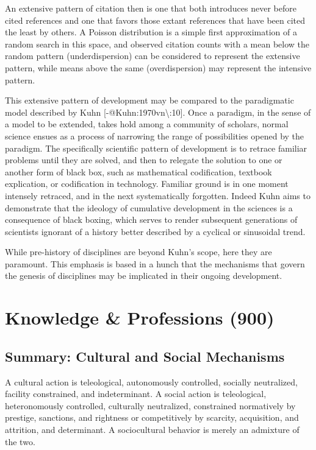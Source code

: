 \documentclass[]{article}
\begin{document}
An extensive pattern of citation then is one that both introduces never
before cited references and one that favors those extant references that
have been cited the least by others. A Poisson distribution is a simple
first approximation of a random search in this space, and observed
citation counts with a mean below the random pattern (underdispersion)
can be considered to represent the extensive pattern, while means above
the same (overdispersion) may represent the intensive pattern.

This extensive pattern of development may be compared to the
paradigmatic model described by Kuhn
{[}-@Kuhn:1970vn\textbackslash{}:10{]}. Once a paradigm, in the sense of
a model to be extended, takes hold among a community of scholars, normal
science ensues as a process of narrowing the range of possibilities
opened by the paradigm. The specifically scientific pattern of
development is to retrace familiar problems until they are solved, and
then to relegate the solution to one or another form of black box, such
as mathematical codification, textbook explication, or codification in
technology. Familiar ground is in one moment intensely retraced, and in
the next systematically forgotten. Indeed Kuhn aims to demonstrate that
the ideology of cumulative development in the sciences is a consequence
of black boxing, which serves to render subsequent generations of
scientists ignorant of a history better described by a cyclical or
sinusoidal trend.

While pre-history of disciplines are beyond Kuhn's scope, here they are
paramount. This emphasis is based in a hunch that the mechanisms that
govern the genesis of disciplines may be implicated in their ongoing
development.

\section{Knowledge \& Professions
(900)}\label{knowledge-professions-900}

\subsection{Summary: Cultural and Social
Mechanisms}\label{summary-cultural-and-social-mechanisms}

A cultural action is teleological, autonomously controlled, socially
neutralized, facility constrained, and indeterminant. A social action is
teleological, heteronomously controlled, culturally neutralized,
constrained normatively by prestige, sanctions, and rightness or
competitively by scarcity, acquisition, and attrition, and determinant.
A sociocultural behavior is merely an admixture of the two.
\end{document}
